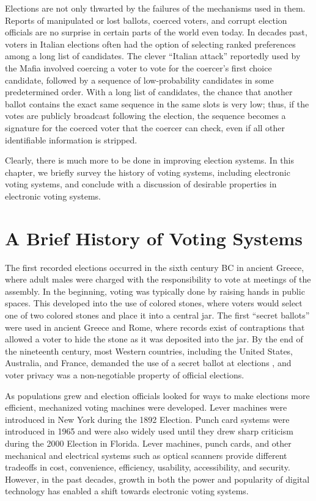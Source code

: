 Elections are not only thwarted by the failures of the mechanisms used in them. Reports of manipulated or lost ballots, coerced voters, and corrupt election officials are no surprise in certain parts of the world even today. In decades past, voters in Italian elections often had the option of selecting ranked preferences among a long list of candidates. The clever ``Italian attack'' \cite{naish:italian-attack} reportedly used by the Mafia involved coercing a voter to vote for the coercer's first choice candidate, followed by a sequence of low-probability candidates in some predetermined order. With a long list of candidates, the chance that another ballot contains the exact same sequence in the same slots is very low; thus, if the votes are publicly broadcast following the election, the sequence becomes a signature for the coerced voter that the coercer can check, even if all other identifiable information is stripped.

Clearly, there is much more to be done in improving election systems. In this chapter, we briefly survey the history of voting systems, including electronic voting systems, and conclude with a discussion of desirable properties in electronic voting systems.

\section{A Brief History of Voting Systems} \label{intro:history}

The first recorded elections occurred in the sixth century BC in ancient Greece, where adult males were charged with the responsibility to vote at meetings of the assembly. In the beginning, voting was typically done by raising hands in public spaces. This developed into the use of colored stones, where voters would select one of two colored stones and place it into a central jar. The first ``secret ballots'' were used in ancient Greece and Rome, where records exist of contraptions that allowed a voter to hide the stone as it was deposited into the jar. By the end of the nineteenth century, most Western countries, including the United States, Australia, and France, demanded the use of a secret ballot at elections \cite{wiki:secret-ballot}, and voter privacy was a non-negotiable property of official elections.

As populations grew and election officials looked for ways to make elections more efficient, mechanized voting machines were developed. Lever machines were introduced in New York during the 1892 Election. Punch card systems were introduced in 1965 and were also widely used until they drew sharp criticism during the 2000 Election in Florida. Lever machines, punch cards, and other mechanical and electrical systems such as optical scanners provide different tradeoffs in cost, convenience, efficiency, usability, accessibility, and security. However, in the past decades, growth in both the power and popularity of digital technology has enabled a shift towards electronic voting systems.

